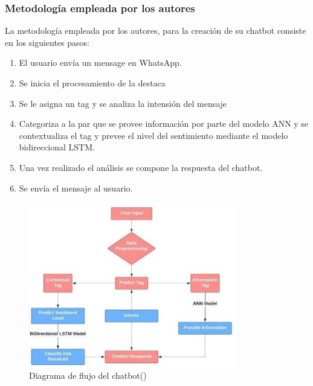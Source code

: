 \subsubsection{Metodología empleada por los autores}
La metodología empleada por los autores, para la creación de su chatbot consiste en los siguientes pasos: 

\begin{enumerate}
    \item El usuario envía un mensage en WhatsApp.
    \item Se inicia el procesamiento de la destaca
    \item Se le asigna un tag y se analiza la intensión del mensaje 
    \item Categoriza a la par que se provee información por parte del modelo ANN y se contextualiza el tag y prevee el nivel del sentimiento mediante el modelo bidireccional LSTM.
    \item Una vez realizado el análisis se compone la respuesta del chatbot.
    \item Se envía el mensaje al usuario.
\end{enumerate}

\begin{figure}[h]
	\begin{center}
		\includegraphics[width=0.8\textwidth]{2/figures/5_2.png}
		\caption{Diagrama de flujo del chatbot(\cite{pr_AIPCMHBSA})}
	\end{center}
\end{figure}

